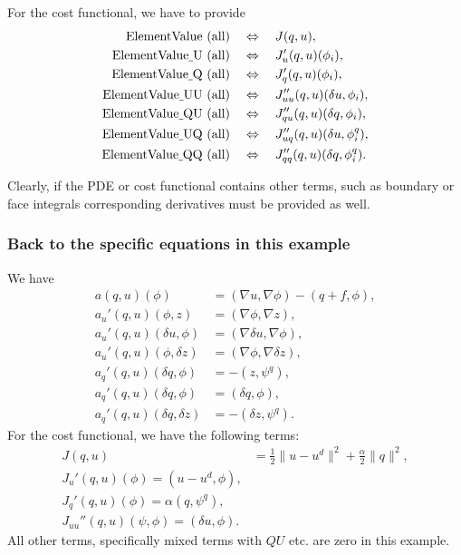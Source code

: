 {For the cost functional, we have to provide
\begin{align*}
\text{ElementValue (all)} \quad  & \Leftrightarrow \quad J(q,u), \\
\text{ElementValue\underline{ }U (all)} \quad  & \Leftrightarrow \quad J_u'(q,u)(\phi_i), \\
\text{ElementValue\underline{ }Q (all)} \quad  & \Leftrightarrow \quad J_q'(q,u)(\phi_i), \\
\text{ElementValue\underline{ }UU (all)} \quad & \Leftrightarrow \quad J_{uu}''(q,u)(\delta u, \phi_i), \\
\text{ElementValue\underline{ }QU (all)} \quad & \Leftrightarrow \quad J_{qu}''(q,u)(\delta q, \phi_i), \\
\text{ElementValue\underline{ }UQ (all)} \quad & \Leftrightarrow \quad J_{uq}''(q,u)(\delta u, \phi^q_i), \\
\text{ElementValue\underline{ }QQ (all)} \quad & \Leftrightarrow \quad J_{qq}''(q,u)(\delta q, \phi^q_i).
\end{align*}

Clearly, if the PDE or cost functional contains other terms, such as boundary or face integrals 
corresponding derivatives must be provided as well.

\subsubsection{Back to the specific equations in this example}
We have
\begin{align*}
a(q,u)(\phi) &= (\nabla u, \nabla\phi) - (q + f, \phi),\\
a_u'(q,u)(\phi, z) &= (\nabla\phi, \nabla z),\\
a_u'(q,u)(\delta u, \phi) &= (\nabla\delta u, \nabla\phi),\\
a_u'(q,u)(\phi, \delta z) &= (\nabla\phi, \nabla\delta z),\\
a_q'(q,u)(\delta q, \phi) &= -(z,\psi^q),\\
a_q'(q,u)(\delta q, \phi) &= (\delta q,\phi),\\
a_{q}'(q,u)(\delta q,\delta z) &= - (\delta z,\psi^q).
\end{align*}
%
For the cost functional, we have the following terms:
\begin{align*}
J(q,u) &= \frac{1}{2} \|u-u^d\|^2 + \frac{\alpha}{2}\|q\|^2,\\
J_u'(q,u)(\phi) = (u-u^d, \phi),\\
J_q'(q,u)(\phi) = \alpha (q,\psi^q),\\
J_{uu}''(q,u)(\psi, \phi) = (\delta u, \phi).
\end{align*}
All other terms, specifically mixed terms with $QU$ etc. are zero in this
example. 

}
